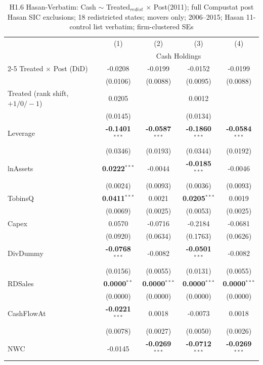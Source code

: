 \begin{landscape}
\begin{table}[H]
\setlength{\tabcolsep}{3pt}
\renewcommand{\arraystretch}{0.85}
\centering
\caption{H1.6 Hasan-Verbatim: Cash $\sim$ Treated$_{redist}$ $\times$ Post(2011); full Compustat post Hasan SIC exclusions; 18 redistricted states; movers only; 2006--2015; Hasan 11-control list verbatim; firm-clustered SEs}
\label{tab:h1_6_hasan_verbatim}
\scriptsize
\begin{tabular}{lcccc}
\toprule
 & (1) & (2) & (3) & (4) \\
 & \multicolumn{4}{c}{Cash Holdings} \\
\cmidrule(lr){2-5}
\midrule
Treated $\times$ Post (DiD) & -0.0208 & -0.0199 & -0.0152 & -0.0199 \\
 & (0.0106) & (0.0088) & (0.0095) & (0.0088) \\
Treated (rank shift, $+1/0/-1$) & 0.0205 &  & 0.0012 &  \\
 & (0.0145) &  & (0.0134) &  \\
\midrule
Leverage & \textbf{-0.1401}$^{***}$ & \textbf{-0.0587}$^{***}$ & \textbf{-0.1860}$^{***}$ & \textbf{-0.0584}$^{***}$ \\
 & (0.0346) & (0.0193) & (0.0344) & (0.0192) \\
lnAssets & \textbf{0.0222}$^{***}$ & -0.0044 & \textbf{-0.0185}$^{***}$ & -0.0046 \\
 & (0.0024) & (0.0093) & (0.0036) & (0.0093) \\
TobinsQ & \textbf{0.0411}$^{***}$ & 0.0021 & \textbf{0.0205}$^{***}$ & 0.0019 \\
 & (0.0069) & (0.0025) & (0.0053) & (0.0025) \\
Capex & 0.0570 & -0.0716 & -0.2184 & -0.0681 \\
 & (0.0920) & (0.0634) & (0.1763) & (0.0626) \\
DivDummy & \textbf{-0.0768}$^{***}$ & -0.0082 & \textbf{-0.0501}$^{***}$ & -0.0082 \\
 & (0.0156) & (0.0055) & (0.0131) & (0.0055) \\
RDSales & \textbf{0.0000}$^{**}$ & \textbf{0.0000}$^{***}$ & \textbf{0.0000}$^{***}$ & \textbf{0.0000}$^{***}$ \\
 & (0.0000) & (0.0000) & (0.0000) & (0.0000) \\
CashFlowAt & \textbf{-0.0221}$^{***}$ & 0.0018 & -0.0073 & 0.0018 \\
 & (0.0078) & (0.0027) & (0.0050) & (0.0026) \\
NWC & -0.0145 & \textbf{-0.0269}$^{***}$ & \textbf{-0.0712}$^{***}$ & \textbf{-0.0269}$^{***}$ \\

\end{tabular}
\end{table}
\end{landscape}
